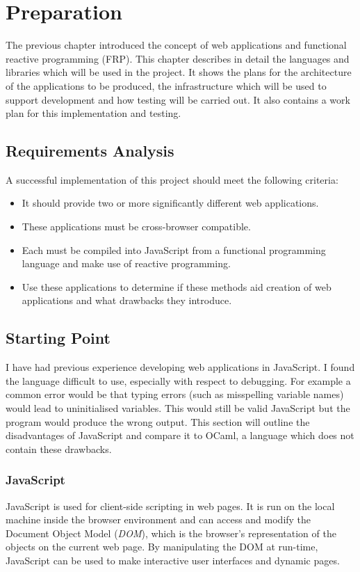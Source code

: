 \chapter{Preparation}

The previous chapter introduced the concept of web applications and functional reactive programming (FRP). This chapter describes in detail the languages and libraries which will be used in the project. It shows the plans for the architecture of the applications to be produced, the infrastructure which will be used to support development and how testing will be carried out. It also contains a work plan for this implementation and testing.

\section{Requirements Analysis}
A successful implementation of this project should meet the following criteria:
\begin{itemize}
\item It should provide two or more significantly different web applications.
\item These applications must be cross-browser compatible.
\item Each must be compiled into JavaScript from a functional programming language and make use of reactive programming.
\item Use these applications to determine if these methods aid creation of web applications and what drawbacks they introduce.
\end{itemize}

\section{Starting Point}

I have had previous experience developing web applications in JavaScript. I found the language difficult to use, especially with respect to debugging. For example a common error would be that typing errors (such as misspelling variable names) would lead to uninitialised variables. This would still be valid JavaScript but the program would produce the wrong output. This section will outline the disadvantages of JavaScript and compare it to OCaml, a language which does not contain these drawbacks. 

\subsection{JavaScript}
JavaScript is used for client-side scripting in web pages. It is run on the local machine inside the browser environment and can access and modify the Document Object Model (\emph{DOM}), which is the browser's representation of the  objects on the current web page. By manipulating the DOM at run-time, JavaScript can be used to make interactive user interfaces and dynamic pages.

